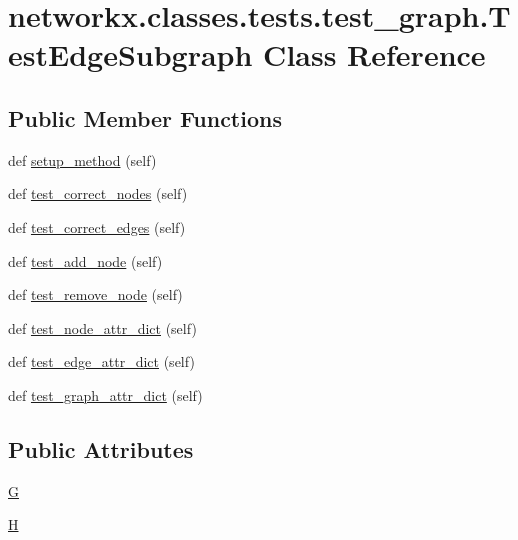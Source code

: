 \hypertarget{classnetworkx_1_1classes_1_1tests_1_1test__graph_1_1TestEdgeSubgraph}{}\section{networkx.\+classes.\+tests.\+test\+\_\+graph.\+Test\+Edge\+Subgraph Class Reference}
\label{classnetworkx_1_1classes_1_1tests_1_1test__graph_1_1TestEdgeSubgraph}
\subsection*{Public Member Functions}
\begin{DoxyCompactItemize}
\item 
def \hyperlink{classnetworkx_1_1classes_1_1tests_1_1test__graph_1_1TestEdgeSubgraph_a3c89f0aedf96be90c3139c216f6ec438}{setup\+\_\+method} (self)
\item 
def \hyperlink{classnetworkx_1_1classes_1_1tests_1_1test__graph_1_1TestEdgeSubgraph_a041a4b4e3ed4b2267f5f3f350d273c44}{test\+\_\+correct\+\_\+nodes} (self)
\item 
def \hyperlink{classnetworkx_1_1classes_1_1tests_1_1test__graph_1_1TestEdgeSubgraph_a7458642fa01908ba27514001b8bea0a4}{test\+\_\+correct\+\_\+edges} (self)
\item 
def \hyperlink{classnetworkx_1_1classes_1_1tests_1_1test__graph_1_1TestEdgeSubgraph_a99b38aa797dbd08f3badcebe5219589b}{test\+\_\+add\+\_\+node} (self)
\item 
def \hyperlink{classnetworkx_1_1classes_1_1tests_1_1test__graph_1_1TestEdgeSubgraph_a73ae0e70697c2966edce2a6c967c243f}{test\+\_\+remove\+\_\+node} (self)
\item 
def \hyperlink{classnetworkx_1_1classes_1_1tests_1_1test__graph_1_1TestEdgeSubgraph_a767e38205d5e41c1f801ac96ce803880}{test\+\_\+node\+\_\+attr\+\_\+dict} (self)
\item 
def \hyperlink{classnetworkx_1_1classes_1_1tests_1_1test__graph_1_1TestEdgeSubgraph_af69a2b5c87b280db2b33717a589e0187}{test\+\_\+edge\+\_\+attr\+\_\+dict} (self)
\item 
def \hyperlink{classnetworkx_1_1classes_1_1tests_1_1test__graph_1_1TestEdgeSubgraph_a8f2ac909aadb4a9480945bdce5e21305}{test\+\_\+graph\+\_\+attr\+\_\+dict} (self)
\end{DoxyCompactItemize}
\subsection*{Public Attributes}
\begin{DoxyCompactItemize}
\item 
\hyperlink{classnetworkx_1_1classes_1_1tests_1_1test__graph_1_1TestEdgeSubgraph_a4f12bce2117e8d7705b9f62e9c76ae43}{G}
\item 
\hyperlink{classnetworkx_1_1classes_1_1tests_1_1test__graph_1_1TestEdgeSubgraph_a8d72c95409f6901723d521bca3a22eab}{H}
\end{DoxyCompactItemize}


